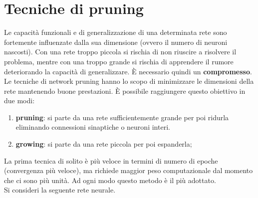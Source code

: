 \section{Tecniche di pruning} %
\label{sec:tecniche_di_pruning}
Le capacità funzionali e di generalizzazione di una determinata rete sono fortemente influenzate dalla sua dimensione (ovvero il numero di neuroni nascosti). Con una rete troppo piccola si rischia di non riuscire a risolvere il problema, mentre con una troppo grande si rischia di apprendere il rumore deteriorando la capacità di generalizzare. È necessario quindi un \textbf{compromesso}.\\

Le tecniche di network pruning hanno lo scopo di minimizzare le dimensioni della rete mantenendo buone prestazioni. È possibile raggiungere questo obiettivo in due modi:
\begin{enumerate}
    \item \textbf{pruning}: si parte da una rete sufficientemente grande per poi ridurla eliminando connessioni sinaptiche o neuroni interi.
    \item \textbf{growing}: si parte da una rete piccola per poi espanderla;
\end{enumerate}
La prima tecnica di solito è più veloce in termini di numero di epoche (convergenza più veloce), ma richiede maggior peso computazionale dal momento che ci sono più unità. Ad ogni modo questo metodo è il più adottato.\\

Si consideri la seguente rete neurale.

